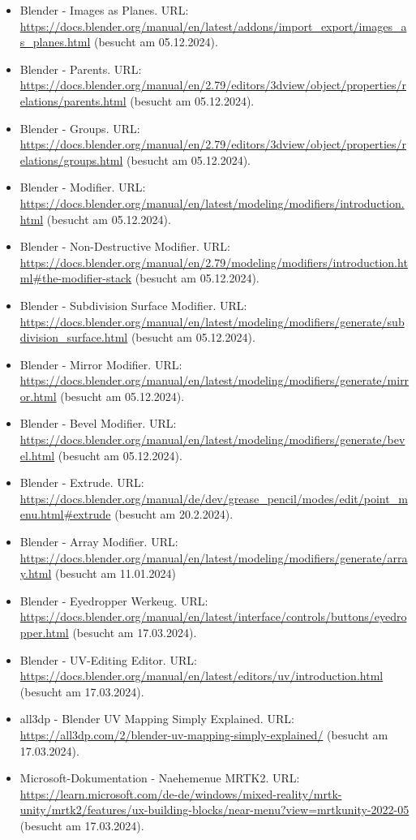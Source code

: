 \begin{itemize}
    \item Blender - Images as Planes. URL: \url{https://docs.blender.org/manual/en/latest/addons/import_export/images_as_planes.html} (besucht am 05.12.2024).
    \item Blender - Parents. URL: \url{https://docs.blender.org/manual/en/2.79/editors/3dview/object/properties/relations/parents.html} (besucht am 05.12.2024).
    \item Blender - Groups. URL: \url{https://docs.blender.org/manual/en/2.79/editors/3dview/object/properties/relations/groups.html} (besucht am 05.12.2024).
    \item Blender - Modifier. URL: \url{https://docs.blender.org/manual/en/latest/modeling/modifiers/introduction.html} (besucht am 05.12.2024).
    \item Blender - Non-Destructive Modifier. URL: \url{https://docs.blender.org/manual/en/2.79/modeling/modifiers/introduction.html#the-modifier-stack} (besucht am 05.12.2024).
    \item Blender - Subdivision Surface Modifier. URL: \url{https://docs.blender.org/manual/en/latest/modeling/modifiers/generate/subdivision_surface.html} (besucht am 05.12.2024).
    \item Blender - Mirror Modifier. URL: \url{https://docs.blender.org/manual/en/latest/modeling/modifiers/generate/mirror.html} (besucht am 05.12.2024).
    \item Blender - Bevel Modifier. URL: \url{https://docs.blender.org/manual/en/latest/modeling/modifiers/generate/bevel.html} (besucht am 05.12.2024).
    \item Blender - Extrude. URL: \url{https://docs.blender.org/manual/de/dev/grease_pencil/modes/edit/point_menu.html#extrude} (besucht am 20.2.2024).
    \item Blender - Array Modifier. URL: \url{https://docs.blender.org/manual/en/latest/modeling/modifiers/generate/array.html} (besucht am 11.01.2024)
    \item Blender - Eyedropper Werkeug. URL: \url{https://docs.blender.org/manual/en/latest/interface/controls/buttons/eyedropper.html} (besucht am 17.03.2024).
    \item Blender - UV-Editing Editor. URL: \url{https://docs.blender.org/manual/en/latest/editors/uv/introduction.html} (besucht am 17.03.2024).
    \item all3dp - Blender UV Mapping Simply Explained. URL: \url{https://all3dp.com/2/blender-uv-mapping-simply-explained/} (besucht am 17.03.2024).
    \item Microsoft-Dokumentation - Naehemenue MRTK2. URL: \url{https://learn.microsoft.com/de-de/windows/mixed-reality/mrtk-unity/mrtk2/features/ux-building-blocks/near-menu?view=mrtkunity-2022-05} (besucht am 17.03.2024).

\end{itemize}
